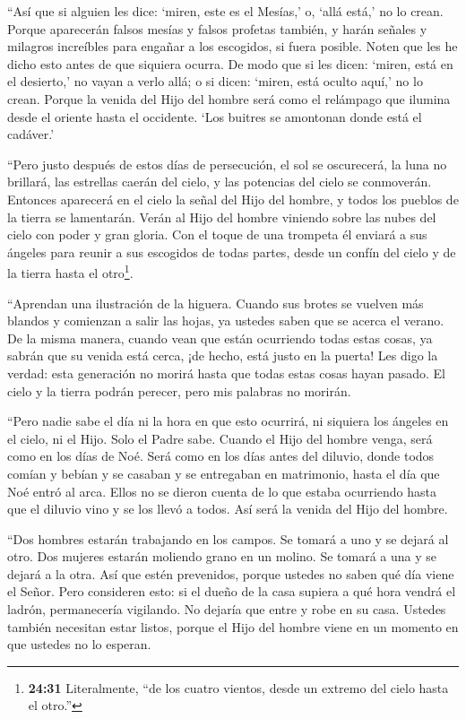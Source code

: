  ``Así que si alguien les dice: `miren, este es el Mesías,'
o, `allá está,' no lo crean.  Porque aparecerán falsos
mesías y falsos profetas también, y harán señales y milagros increíbles
para engañar a los escogidos, si fuera posible.  Noten que
les he dicho esto antes de que siquiera ocurra.  De modo
que si les dicen: `miren, está en el desierto,' no vayan a verlo allá; o
si dicen: `miren, está oculto aquí,' no lo crean.  Porque
la venida del Hijo del hombre será como el relámpago que ilumina desde
el oriente hasta el occidente.  `Los buitres se amontonan
donde está el cadáver.'

 ``Pero justo después de estos días de persecución, el sol
se oscurecerá, la luna no brillará, las estrellas caerán del cielo, y
las potencias del cielo se conmoverán.  Entonces aparecerá
en el cielo la señal del Hijo del hombre, y todos los pueblos de la
tierra se lamentarán. Verán al Hijo del hombre viniendo sobre las nubes
del cielo con poder y gran gloria.  Con el toque de una
trompeta él enviará a sus ángeles para reunir a sus escogidos de todas
partes, desde un confín del cielo y de la tierra hasta el
otro\footnote{\textbf{24:31} Literalmente, ``de los cuatro vientos,
  desde un extremo del cielo hasta el otro.''}.

 ``Aprendan una ilustración de la higuera. Cuando sus
brotes se vuelven más blandos y comienzan a salir las hojas, ya ustedes
saben que se acerca el verano.  De la misma manera, cuando
vean que están ocurriendo todas estas cosas, ya sabrán que su venida
está cerca, ¡de hecho, está justo en la puerta!  Les digo
la verdad: esta generación no morirá hasta que todas estas cosas hayan
pasado.  El cielo y la tierra podrán perecer, pero mis
palabras no morirán.

 ``Pero nadie sabe el día ni la hora en que esto ocurrirá,
ni siquiera los ángeles en el cielo, ni el Hijo. Solo el Padre sabe.
 Cuando el Hijo del hombre venga, será como en los días de
Noé.  Será como en los días antes del diluvio, donde todos
comían y bebían y se casaban y se entregaban en matrimonio, hasta el día
que Noé entró al arca.  Ellos no se dieron cuenta de lo que
estaba ocurriendo hasta que el diluvio vino y se los llevó a todos. Así
será la venida del Hijo del hombre.

 ``Dos hombres estarán trabajando en los campos. Se tomará
a uno y se dejará al otro.  Dos mujeres estarán moliendo
grano en un molino. Se tomará a una y se dejará a la otra. 
Así que estén prevenidos, porque ustedes no saben qué día viene el
Señor.  Pero consideren esto: si el dueño de la casa
supiera a qué hora vendrá el ladrón, permanecería vigilando. No dejaría
que entre y robe en su casa.  Ustedes también necesitan
estar listos, porque el Hijo del hombre viene en un momento en que
ustedes no lo esperan.

